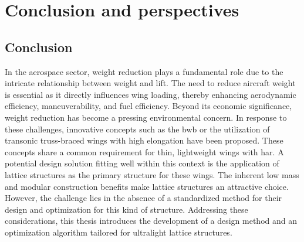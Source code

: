 \setchapterpreamble[u]{\margintoc}
\glsresetall %

\chapter*{Conclusion and perspectives}
{}
%

\section*{Conclusion}
In the aerospace sector, weight reduction plays a fundamental role due to the intricate relationship between weight and lift. The need to reduce aircraft weight is essential as it directly influences wing loading, thereby enhancing aerodynamic efficiency, maneuverability, and fuel efficiency. Beyond its economic significance, weight reduction has become a pressing environmental concern. In response to these challenges, innovative concepts such as the \gls{bwb} or the utilization of transonic truss-braced wings with high elongation have been proposed. These concepts share a common requirement for thin, lightweight wings with \gls{har}. A potential design solution fitting well within this context is the application of lattice structures as the primary structure for these wings. The inherent low mass and modular construction benefits make lattice structures an attractive choice. However, the challenge lies in the absence of a standardized method for their design and optimization for this kind of structure. Addressing these considerations, this thesis introduces the development of a design method and an optimization algorithm tailored for ultralight lattice structures.


